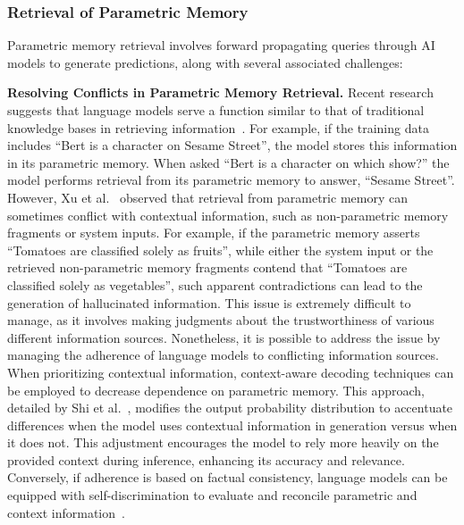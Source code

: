 \documentclass[journal,hideappendix]{vgtc}
\newenvironment{j_itemize}{
\begin{itemize}[]
  \setlength{\itemsep}{3pt}
  \setlength{\parskip}{0pt}
  \setlength{\parsep}{0pt}
}{\end{itemize}}
\begin{document}
\subsubsection{Retrieval of Parametric Memory}
\label{sec:AI_memory:parametric:memory_retrieval}

Parametric memory retrieval involves forward propagating queries through AI models to generate predictions, along with several associated challenges: 

\begin{j_itemize}

    \item[$\bullet$] \textbf{Resolving Conflicts in Parametric Memory Retrieval.} 
    Recent research suggests that language models serve a function similar to that of traditional knowledge bases in retrieving information~\cite{petroni2019language,robertsetal2020much,heinzerlinginui2021language,gui2022kat}. For example, if the training data includes ``Bert is a character on Sesame Street'', the model stores this information in its parametric memory. When asked ``Bert is a character on which show?'' the model performs retrieval from its parametric memory to answer, ``Sesame Street''. However, Xu et al.~\cite{xu2024knowledge} observed that retrieval from parametric memory can sometimes conflict with contextual information, such as non-parametric memory fragments or system inputs. For example, if the parametric memory asserts ``Tomatoes are classified solely as fruits'', while either the system input or the retrieved non-parametric memory fragments contend that ``Tomatoes are classified solely as vegetables'', such apparent contradictions
    can lead to the generation of hallucinated information. 
    This issue is extremely difficult to manage, as it involves making judgments about the trustworthiness of various different information sources. 
    Nonetheless, it is possible to address the issue by managing the adherence of language models to conflicting information sources. When prioritizing contextual information, context-aware decoding techniques can be employed to decrease dependence on parametric memory. This approach, detailed by Shi et al.~\cite{shi2023trusting}, modifies the output probability distribution to accentuate differences when the model uses contextual information in generation versus when it does not. This adjustment encourages the model to rely more heavily on the provided context during inference, enhancing its accuracy and relevance. Conversely, if adherence is based on factual consistency, language models can be equipped with self-discrimination to evaluate and reconcile parametric and context information~\cite{pan2023attacking,hong2023so}.


\end{j_itemize}
\end{document}
